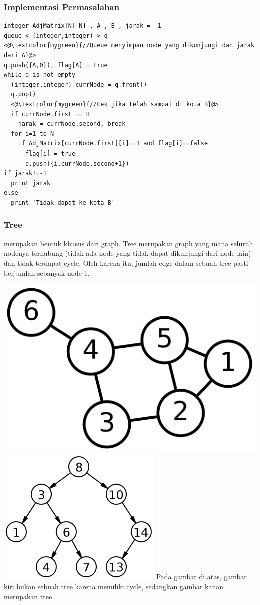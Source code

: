 \begin{frame}[fragile]
\frametitle{Implementasi Permasalahan}

\begin{lstlisting}
integer AdjMatrix[N][N] , A , B , jarak = -1
queue < (integer,integer) > q
<@\textcolor{mygreen}{//Queue menyimpan node yang dikunjungi dan jarak dari A}@>
q.push({A,0}), flag[A] = true
while q is not empty
  (integer,integer) currNode = q.front()
  q.pop()
  <@\textcolor{mygreen}{//Cek jika telah sampai di kota B}@>
  if currNode.first == B
    jarak = currNode.second, break
  for i=1 to N
    if AdjMatrix[currNode.first][i]==1 and flag[i]==false
      flag[i] = true
      q.push({i,currNode.second+1})
if jarak!=-1
  print jarak
else
  print 'Tidak dapat ke kota B'    
\end{lstlisting}
\end{frame}

\begin{frame}
\frametitle{Tree}
 merupakan bentuk khusus dari graph. Tree merupakan graph yang mana seluruh nodenya terhubung (tidak ada node yang tidak dapat dikunjungi dari node lain) dan tidak terdapat cycle. Oleh karena itu, jumlah edge dalam sebuah tree pasti berjumlah sebanyak node-1.

\includegraphics[width=4 cm]{asset/not-tree.png}
\hspace{\fill}
\includegraphics[width=4 cm]{asset/tree.png}
\newline\newline
Pada gambar di atas, gambar kiri bukan sebuah tree karena memiliki cycle, sedangkan gambar kanan merupakan tree. 
\end{frame}

